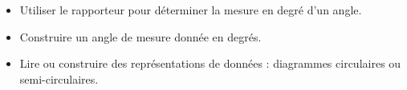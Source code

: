 \begin{prerequis}
    \begin{itemize}        
        \item[\emoji{diamond-suit}] Utiliser le rapporteur pour déterminer la mesure en degré d’un angle.         
        \item[\emoji{diamond-suit}] Construire un angle de mesure donnée en degrés.
        \item[\emoji{diamond-suit}] Lire ou construire des représentations de données : diagrammes circulaires ou semi-circulaires.
    \end{itemize}
\end{prerequis}
